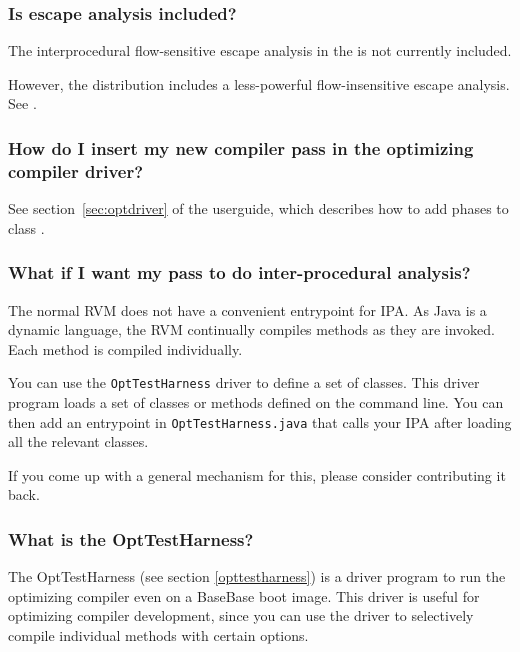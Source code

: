\subsubsection{Is escape analysis included?}

The interprocedural flow-sensitive escape analysis in the 
 is not currently included.

However, the distribution includes a less-powerful flow-insensitive
escape analysis.  See  
.

\subsubsection{How do I insert my new compiler pass in the optimizing
compiler driver?}

See section~\ref{sec:optdriver} of the userguide, which describes how to
add phases to class 
.

\subsubsection{What if I want my pass to do inter-procedural analysis?}

The normal RVM does not have a convenient entrypoint for IPA.  As Java is
a dynamic language, the RVM continually compiles methods as they are
invoked.  Each method is compiled individually.

You can use the {\tt OptTestHarness} driver to define a set of classes. 
This driver program loads a set of classes or methods defined on the
command line.  You can then add an entrypoint in {\tt OptTestHarness.java}
that calls your IPA after loading all the relevant classes.

If you come up with a general mechanism for this, please consider
contributing it back.

\subsubsection{What is the OptTestHarness?}

The OptTestHarness (see section \ref{opttestharness}) is a driver
program to run the optimizing compiler even on a BaseBase boot image.
This driver is useful for optimizing compiler development, since you
can use the driver to selectively compile individual methods with
certain options.

